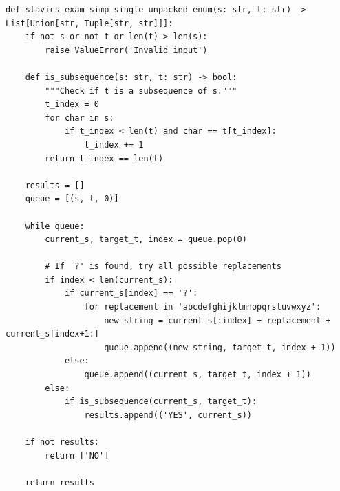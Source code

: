 \documentclass[acmsmall,screen,nonacm]{acmart}
\begin{document}
{\scriptsize
\begin{tcolorbox}[mybox,breakable,title={ENUM solution}]
\begin{verbatim}
def slavics_exam_simp_single_unpacked_enum(s: str, t: str) -> List[Union[str, Tuple[str, str]]]:
    if not s or not t or len(t) > len(s):
        raise ValueError('Invalid input')

    def is_subsequence(s: str, t: str) -> bool:
        """Check if t is a subsequence of s."""
        t_index = 0
        for char in s:
            if t_index < len(t) and char == t[t_index]:
                t_index += 1
        return t_index == len(t)

    results = []
    queue = [(s, t, 0)]
    
    while queue:
        current_s, target_t, index = queue.pop(0)
        
        # If '?' is found, try all possible replacements
        if index < len(current_s):
            if current_s[index] == '?':
                for replacement in 'abcdefghijklmnopqrstuvwxyz':
                    new_string = current_s[:index] + replacement + current_s[index+1:]
                    queue.append((new_string, target_t, index + 1))
            else:
                queue.append((current_s, target_t, index + 1))
        else:
            if is_subsequence(current_s, target_t):
                results.append(('YES', current_s))

    if not results:
        return ['NO']
    
    return results
\end{verbatim}
\end{tcolorbox}
}
\end{document}
